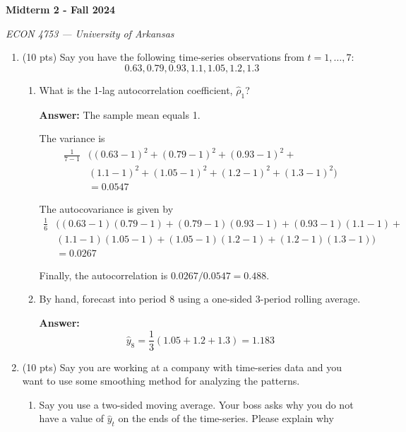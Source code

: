 \documentclass[12pt]{article}
\newcommand{\answer}[1]{{\color{blue_winged_teal}\textbf{Answer:} #1}}
\newcommand{\pts}[1]{{\color{zinc500}(#1 pts)}}
\begin{document}
\begin{center}
  {\Huge\bf Midterm 2 - Fall 2024}
  
  \smallskip
  {\large\it ECON 4753 — University of Arkansas}
\end{center}

\vspace{5mm}
\begin{enumerate}
  \item \pts{10} Say you have the following time-series observations from $t = 1, \dots, 7$:
  \vspace*{-\bigskipamount}
  $$
    0.63, 0.79, 0.93, 1.1, 1.05, 1.2, 1.3
  $$

  \begin{enumerate}
    \item What is the 1-lag autocorrelation coefficient, $\hat{\rho}_1$?
    
    \answer{
      The sample mean equals 1.

      The variance is
      \begin{align*}
        \frac{1}{7 - 1} &\big( 
        (0.63 - 1)^2 + (0.79 - 1)^2 + (0.93 - 1)^2 + \\
        &(1.1 - 1)^2 + (1.05 - 1)^2 + (1.2 - 1)^2 + (1.3 - 1)^2 \big) \\
        &= 0.0547
      \end{align*}

      The autocovariance is given by 
      \begin{align*}
        \frac{1}{6} &\big( 
        (0.63 - 1) (0.79 - 1) + (0.79 - 1) (0.93 - 1) + (0.93 - 1) (1.1 - 1) + \\
        &(1.1 - 1) (1.05 - 1) + (1.05 - 1) (1.2 - 1) + (1.2 - 1) (1.3 - 1) \big) \\
        &= 0.0267
      \end{align*}

      Finally, the autocorrelation is $0.0267 / 0.0547 = 0.488$.
    }
      
    \item By hand, forecast into period $8$ using a one-sided 3-period rolling average.

    \answer{
      $$
        \hat{y}_{8} = \frac{1}{3} (1.05 + 1.2 + 1.3) = 1.183
      $$
    }
  \end{enumerate}
  
  \item \pts{10} Say you are working at a company with time-series data and you want to use some smoothing method for analyzing the patterns. 
  \begin{enumerate}
    \item Say you use a two-sided moving average. Your boss asks why you do not have a value of $\hat{y}_t$ on the ends of the time-series. Please explain why
    

\end{enumerate}
\end{enumerate}
\end{document}
